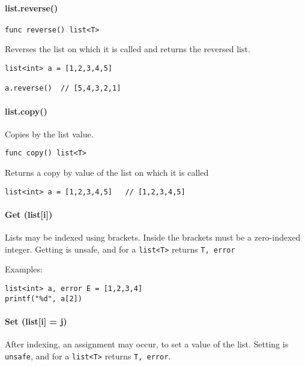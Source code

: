 \documentclass[]{article}
\begin{document}
\paragraph{list.reverse()}\label{list.reverse}

\begin{verbatim}
func reverse() list<T>
\end{verbatim}

Reverses the list on which it is called and returns the reversed list.

\begin{verbatim}
list<int> a = [1,2,3,4,5]

a.reverse()  // [5,4,3,2,1]
\end{verbatim}

\paragraph{list.copy()}\label{list.copy}

Copies by the list value.

\begin{verbatim}
func copy() list<T>
\end{verbatim}

Returns a copy by value of the list on which it is called

\begin{verbatim}
list<int> a = [1,2,3,4,5]   // [1,2,3,4,5]
\end{verbatim}

\paragraph{Get (list{[}i{]})}\label{get-listi}

Lists may be indexed using brackets. Inside the brackets must be a
zero-indexed integer. Getting is unsafe, and for a
\texttt{list\textless{}T\textgreater{}} returns \texttt{T, error}

Examples:

\begin{verbatim}
list<int> a, error E = [1,2,3,4]
printf("%d", a[2])
\end{verbatim}

\paragraph{Set (list{[}i{]} = j)}\label{set-listi-j}

After indexing, an assignment may occur, to set a value of the list.
Setting is \texttt{unsafe}, and for a
\texttt{list\textless{}T\textgreater{}} returns \texttt{T, error}.
\end{document}
